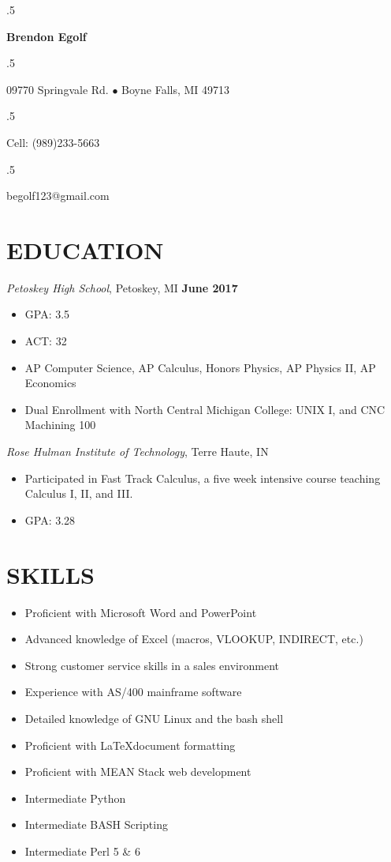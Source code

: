 \documentclass[margin, line]{res}
\begin{document}
 \moveleft.5\hoffset\centerline{\large\bf Brendon Egolf}
 \moveleft.5\hoffset\centerline{09770 Springvale Rd. $\bullet$ Boyne Falls, MI 49713}
 \moveleft.5\hoffset\centerline{Cell: (989)233-5663}
 \moveleft.5\hoffset\centerline{begolf123@gmail.com}


\begin{resume}
\noindent

  \section{EDUCATION} {\sl Petoskey High School}, Petoskey, MI \hfill \textbf{June 2017} \\
                \begin{itemize}
                    \item GPA: 3.5
                    \item ACT: 32
                    \item AP Computer Science, AP Calculus, Honors Physics, AP Physics II, AP
                    Economics
                    \item Dual Enrollment with North Central Michigan College: UNIX I,
                      and CNC Machining 100
                \end{itemize}

{\sl Rose Hulman Institute of Technology}, Terre Haute, IN \\
                \begin{itemize}
                  \item Participated in Fast Track Calculus, a five week intensive
                    course teaching Calculus I, II, and III.
                  \item GPA: 3.28
                \end{itemize}

\section{SKILLS}
  \begin{itemize}
    \item Proficient with Microsoft Word and PowerPoint
    \item Advanced knowledge of Excel (macros, VLOOKUP, INDIRECT, etc.)
    \item Strong customer service skills in a sales environment
    \item Experience with AS/400 mainframe software
    \item Detailed knowledge of GNU Linux and the bash shell
    \item Proficient with \LaTeX document formatting
    \item Proficient with MEAN Stack web development
    \item Intermediate Python
    \item Intermediate BASH Scripting
    \item Intermediate Perl 5 \& 6
  \end{itemize}


\end{resume}
\end{document}
